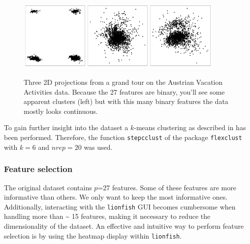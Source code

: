 \documentclass[article]{ajs}
\begin{document}
\begin{figure}[h]
\centerline{\includegraphics[width=0.3\textwidth]{images/winter_proj1.pdf}\includegraphics[width=0.3\textwidth]{images/winter_proj2.pdf}\includegraphics[width=0.3\textwidth]{images/winter_proj3.pdf}}
\caption{Three 2D projections from a grand tour on the Austrian Vacation Activities data. Because the 27 features are binary, you'll see some apparent clusters (left) but with this many binary features the data mostly looks continuous.}
\label{winter-gt}
\end{figure}


To gain further insight into the dataset a $k$-means clustering as described in \cite{leisch2018market} has been performed. Therefore, the function \texttt{stepcclust} of the  package \texttt{flexclust}\citep{flexclust} with $k=6$ and $nrep=20$ was used.

\subsubsection{Feature selection}

The original dataset contains \(p\)=27 features. Some of these features are more informative than others. We only want to keep the most informative ones. Additionally, interacting with the \texttt{lionfish} GUI becomes cumbersome when handling more than \textasciitilde
 15 features, making it necessary to reduce the dimensionality of the dataset. An effective and intuitive way to perform feature selection is by using the heatmap display within \texttt{lionfish}. 
\end{document}

